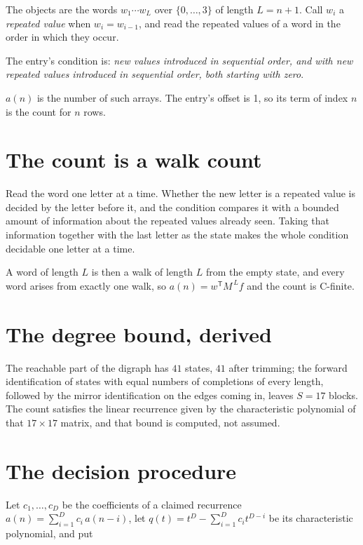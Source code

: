 \documentclass[11pt]{article}
\theoremstyle{definition}
\begin{document}
The objects are the words $w_1\cdots w_L$ over $\{0,\dots,3\}$ of length $L = n + 1$. Call $w_i$ a {\itshape repeated value} when $w_i = w_{i-1}$, and read the repeated values of a word in the order in which they occur.

The entry's condition is: {\itshape new values introduced in sequential order, and with new repeated values introduced in sequential order, both starting with zero}.

$a(n)$ is the number of such arrays. The entry's offset is 1, so its term of index $n$ is the count for $n$ rows.

\section{The count is a walk count}

Read the word one letter at a time. Whether the new letter is a repeated value is decided by the letter before it, and the condition compares it with a bounded amount of information about the repeated values already seen. Taking that information together with the last letter as the state makes the whole condition decidable one letter at a time.

A word of length $L$ is then a walk of length $L$ from the empty state, and every word arises from exactly one walk, so $a(n) = w^{\mathsf T}M^{\,L}f$ and the count is C-finite.

\section{The degree bound, derived}

The reachable part of the digraph has $41$ states, $41$ after trimming; the forward identification of states with equal numbers of completions of every length, followed by the mirror identification on the edges coming in, leaves $S = 17$ blocks. The count satisfies the linear recurrence given by the characteristic polynomial of that $17\times17$ matrix, and that bound is computed, not assumed.

\section{The decision procedure}

Let $c_1,\dots,c_D$ be the coefficients of a claimed recurrence $a(n) = \sum_{i=1}^{D} c_i\,a(n-i)$, let $q(t) = t^{D} - \sum_{i=1}^{D} c_i t^{D-i}$ be its characteristic polynomial, and put
\end{document}
